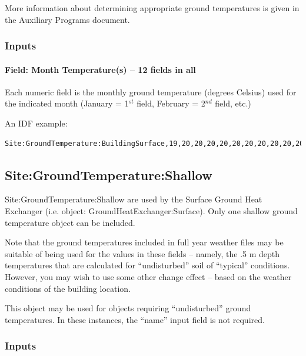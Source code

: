 More information about determining appropriate ground temperatures is given in the Auxiliary Programs document.

\subsubsection{Inputs}\label{inputs-11-008}

\paragraph{Field: Month Temperature(s) -- 12 fields in all}\label{field-month-temperatures-12-fields-in-all}

Each numeric field is the monthly ground temperature (degrees Celsius) used for the indicated month (January = 1\(^{st}\) field, February = 2\(^{nd}\) field, etc.)

An IDF example:

\begin{lstlisting}
Site:GroundTemperature:BuildingSurface,19,20,20,20,20,20,20,20,20,20,20,20;
\end{lstlisting}

\subsection{Site:GroundTemperature:Shallow}\label{sitegroundtemperatureshallow}

Site:GroundTemperature:Shallow are used by the Surface Ground Heat Exchanger (i.e. object: GroundHeatExchanger:Surface). Only one shallow ground temperature object can be included.

\begin{callout}
Note that the ground temperatures included in full year weather files may be suitable of being used for the values in these fields -- namely, the .5 m depth temperatures that are calculated for ``undisturbed'' soil of ``typical'' conditions. However, you may wish to use some other change effect -- based on the weather conditions of the building location.
\end{callout}

This object may be used for objects requiring ``undisturbed'' ground temperatures. In these instances, the ``name'' input field is not required.

\subsubsection{Inputs}\label{inputs-12-008}

